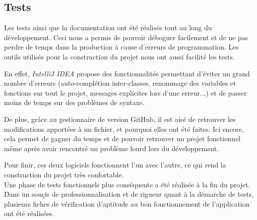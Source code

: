 \documentclass[a4paper,10pt]{article}
\begin{document}
\subsection{Tests}
Les tests ainsi que la documentation ont été réalisés tout au long du développement. Ceci nous a permis de pouvoir déboguer facilement et de ne pas perdre de temps dans la production à cause d'erreurs de programmation. Les outils utilisés pour la construction du projet nous ont aussi facilité les tests. 

En effet, \textit{IntelliJ IDEA} propose des fonctionnalités permettant d'éviter un grand nombre d'erreurs (auto-complétion inter-classes, renommage des variables et fonctions sur tout le projet, messages explicites lors d'une erreur...) et de passer moins de temps sur des problèmes de syntaxe. 

De plus, grâce au gestionnaire de version GitHub, il est aisé de retrouver les modifications apportées à un fichier, et pourquoi elles ont été faites. Ici encore, cela permet de gagner du temps et de pouvoir retrouver un projet fonctionnel même après avoir rencontré un problème lourd lors du développement. 

Pour finir, ces deux logiciels fonctionnent l'un avec l'autre, ce qui rend la construction du projet très confortable.
\\

Une phase de tests fonctionnels plus conséquente a été réalisée à la fin du projet. Dans un souçis de professionnalisation et de rigueur quant à
la démarche de tests, plusieurs fiches de vérification d'aptitude au bon fonctionnement de l'application ont été réalisées.
\end{document}

